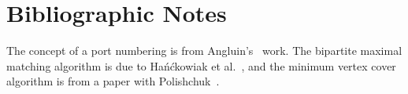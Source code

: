 \section{Bibliographic Notes}

The concept of a port numbering is from Angluin's~\cite{angluin80local} work. The bipartite maximal matching algorithm is due to Ha\'{n}\'{c}kowiak et al.~\cite{hanckowiak98distributed}, and the minimum vertex cover  algorithm is from a paper with Polishchuk~\cite{polishchuk09simple}.

